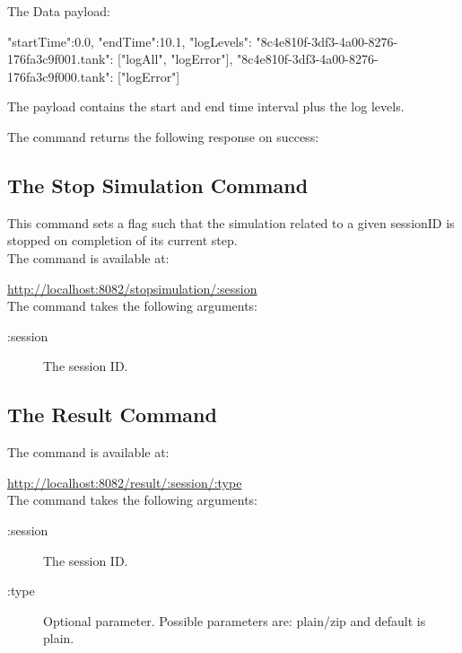 	\noindent The Data payload:
	
	\begin{json}
		{
			"startTime":0.0,
			"endTime":10.1,
			"logLevels": {
				"{8c4e810f-3df3-4a00-8276-176fa3c9f001}.tank":
				["logAll", "logError"],
				"{8c4e810f-3df3-4a00-8276-176fa3c9f000}.tank":
				["logError"]
			}
		}
	\end{json}
	
	The payload contains the start and end time interval plus the log levels.
	
	\noindent The command returns the following response on success:
	
	\begin{json}
	\end{json}

	\subsection{The Stop Simulation Command}
	This command sets a flag such that the simulation related to a given sessionID is stopped on completion of its current step.\\
	
	\noindent The command is available at:
	
	\url{http://localhost:8082/stopsimulation/:session}\\
	
	\noindent The command takes the following arguments:
	
	\begin{description}
		\item[:session] The session ID.
	\end{description}
	
	\subsection{The Result Command}
	The command is available at:
	
	\url{http://localhost:8082/result/:session/:type}\\
	
	\noindent The command takes the following arguments:
	
	\begin{description}
		\item[:session] The session ID.
		\item[:type] Optional parameter. Possible parameters are: plain/zip and default is plain.
	\end{description}
	
